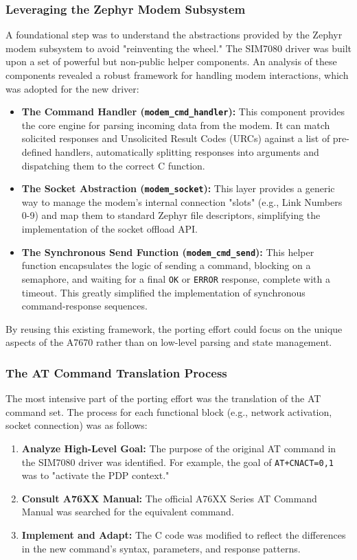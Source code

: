 \subsubsection{Leveraging the Zephyr Modem Subsystem}
A foundational step was to understand the abstractions provided by the Zephyr modem subsystem to avoid "reinventing the wheel." The SIM7080 driver was built upon a set of powerful but non-public helper components. An analysis of these components revealed a robust framework for handling modem interactions, which was adopted for the new driver:
\begin{itemize}
    \item \textbf{The Command Handler (\texttt{modem\_cmd\_handler}):} This component provides the core engine for parsing incoming data from the modem. It can match solicited responses and Unsolicited Result Codes (URCs) against a list of pre-defined handlers, automatically splitting responses into arguments and dispatching them to the correct C function.
    \item \textbf{The Socket Abstraction (\texttt{modem\_socket}):} This layer provides a generic way to manage the modem's internal connection "slots" (e.g., Link Numbers 0-9) and map them to standard Zephyr file descriptors, simplifying the implementation of the socket offload API.
    \item \textbf{The Synchronous Send Function (\texttt{modem\_cmd\_send}):} This helper function encapsulates the logic of sending a command, blocking on a semaphore, and waiting for a final \texttt{OK} or \texttt{ERROR} response, complete with a timeout. This greatly simplified the implementation of synchronous command-response sequences.
\end{itemize}
By reusing this existing framework, the porting effort could focus on the unique aspects of the A7670 rather than on low-level parsing and state management.

\subsubsection{The AT Command Translation Process}
The most intensive part of the porting effort was the translation of the AT command set. The process for each functional block (e.g., network activation, socket connection) was as follows:
\begin{enumerate}
    \item \textbf{Analyze High-Level Goal:} The purpose of the original AT command in the SIM7080 driver was identified. For example, the goal of \texttt{AT+CNACT=0,1} was to "activate the PDP context."
    \item \textbf{Consult A76XX Manual:} The official A76XX Series AT Command Manual was searched for the equivalent command.
    \item \textbf{Implement and Adapt:} The C code was modified to reflect the differences in the new command's syntax, parameters, and response patterns.
\end{enumerate}

